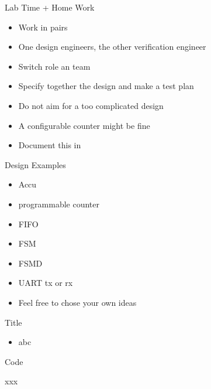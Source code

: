 \begin{frame}[fragile]{Lab Time + Home Work}
\begin{itemize}
\item Work in pairs
\item One design engineers, the other verification engineer
\item Switch role an team
\item Specify together the design and make a test plan
\item Do not aim for a too complicated design
\item A configurable counter might be fine
\item Document this in 
\end{itemize}
\end{frame}

\begin{frame}[fragile]{Design Examples}
\begin{itemize}
\item Accu
\item programmable counter
\item FIFO
\item FSM
\item FSMD
\item UART tx or rx
\item Feel free to chose your own ideas
\end{itemize}
\end{frame}



\begin{frame}[fragile]{Title}
\begin{itemize}
\item abc
\end{itemize}
\end{frame}

\begin{frame}[fragile]{Code}
\begin{chisel}
xxx
\end{chisel}
\end{frame}
